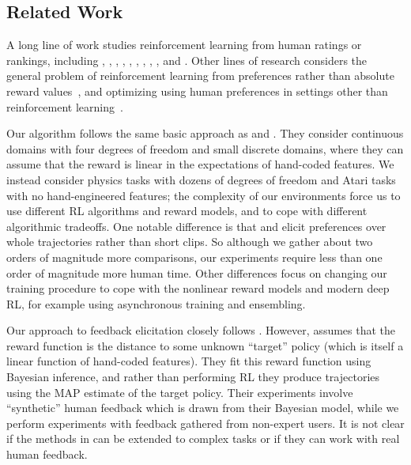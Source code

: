 \documentclass{article}
\begin{document}
\subsection{Related Work}
\label{ssec:related-work}

A long line of work studies
reinforcement learning from human ratings or rankings,
including \citet{Akrour11}, \citet{Pilarski11}, \citet{Akrour12}, \citet{Wilson12}, \citet{Sugiyama12}, \citet{Wirth13}, \citet{Daniel15}, \citet{ElAsri16}, \citet{Wang16}, and \citet{Wirth16}.
Other lines of research considers the general problem of reinforcement learning
from preferences rather than absolute reward values~\citep{Furnkranz12,Akrour14},
and optimizing using human preferences in settings
other than reinforcement learning~\citep{Machwe06, Secretan08, Brochu10, Sorensen16}.

Our algorithm follows the same basic approach as \cite{Akrour12} and \cite{Akrour14}.
They consider continuous domains with four degrees of freedom and small discrete domains, where they can assume that the reward is linear in the expectations of hand-coded features.
We instead consider physics tasks with dozens of degrees of freedom and Atari tasks with no hand-engineered features;
the complexity of our environments force us to use different RL algorithms and reward models,
and to cope with different algorithmic tradeoffs.
One notable difference is that
\cite{Akrour12} and \cite{Akrour14} elicit preferences over whole trajectories rather than short clips.
So although we gather about two orders of magnitude more comparisons,
our experiments require less than one order of magnitude more human time.
Other differences focus on changing our training procedure
to cope with the nonlinear reward models and modern deep RL,
for example using asynchronous training and ensembling.

Our approach to feedback elicitation closely follows \citet{Wilson12}.
However, \citet{Wilson12} assumes that the reward function
is the distance to some unknown ``target'' policy (which is itself a linear function of hand-coded features).
They fit this reward function using Bayesian inference,
and rather than performing RL they produce trajectories using the MAP estimate
of the target policy.
Their experiments involve ``synthetic'' human feedback which is drawn from their Bayesian model,
while we perform experiments with feedback gathered from non-expert users.
It is not clear if the methods in \citet{Wilson12} can be extended to complex tasks or if they can work with real human feedback.
\end{document}
